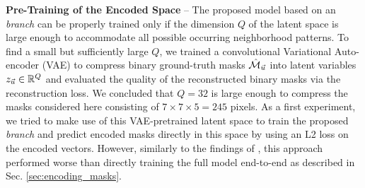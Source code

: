 \textbf{Pre-Training of the Encoded Space} -- The proposed model based on an \emph{\encBr branch} can be properly trained only if the dimension $Q$ of the latent space is large enough to accommodate all possible occurring neighborhood patterns. 
To find a small but sufficiently large $Q$, we trained a convolutional Variational Auto-encoder (VAE) \cite{kingma2013auto,rezende2014stochastic} to compress binary ground-truth \maskname masks $\hat{\mathcal{M}}_{\vec{u}}$ into latent variables $z_{\vec{u}}\in \mathbb{R}^Q$ and evaluated the quality of the reconstructed binary masks via the reconstruction loss. We concluded that $Q=32$ is large enough to compress the masks considered here consisting of $7\times 7 \times 5=245$ pixels. 
As a first experiment, we tried to make use of this VAE-pretrained latent space to train the proposed \emph{\encBr branch} and predict encoded masks directly in this space by using an L2 loss on the encoded vectors. However, similarly to the findings of \cite{hirsch2020patchperpix}, this approach performed worse than directly training the full model end-to-end as described in Sec. \ref{sec:encoding_masks}. 



